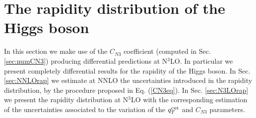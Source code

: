 \documentclass[12pt]{article}
\begin{document}
\section{The rapidity distribution of the Higgs boson}
In this section we make use of the $C_{N3}$ coefficient (computed in Sec. \ref{sec:numCN3}) producing differential predictions at N$^{3}$LO. In particular we present completely differential results for the rapidity of the Higgs boson. In Sec. \ref{sec:NNLOrap}  we estimate at NNLO the uncertainties introduced in the rapidity distribution, by the procedure proposed in Eq. (\ref{CN3eq}). In Sec. \ref{sec:N3LOrap} we present the rapidity distribution at N$^{3}$LO with the corresponding estimation of the uncertainties associated to the variation of the $q_{T}^{\rm cut}$ and $C_{N3}$ parameters.
\end{document}
